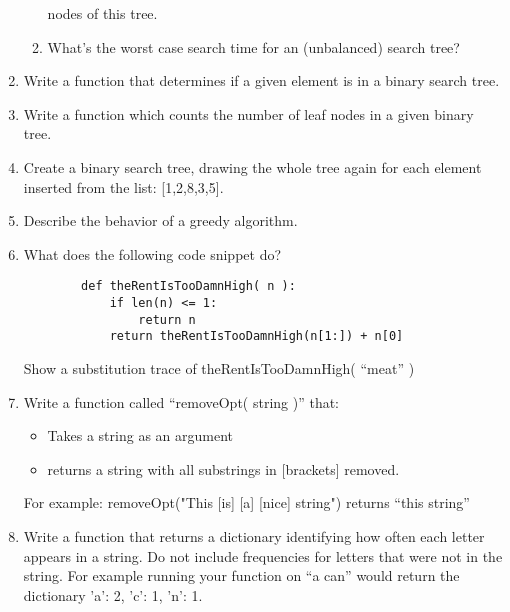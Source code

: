 \documentclass[11pt]{article}
\begin{document}
\begin{enumerate}
\begin{enumerate}
            nodes of this tree.
                \vspace{.25in}
            \item What's the worst case search time for an (unbalanced) search
            tree?
                \pagebreak
        \end{enumerate}
    \item Write a function that determines if a given element is in a binary search tree.
        \vspace{3in}
    \item Write a function which counts the number of leaf nodes in a given binary tree.
        \pagebreak
    \item Create a binary search tree, drawing the whole tree
        again for each element inserted from the list: [1,2,8,3,5].
        \vspace{6in}
    \item Describe the behavior of a greedy algorithm.
        \pagebreak

    \item What does the following code snippet do?
        \begin{verbatim}
        def theRentIsTooDamnHigh( n ):
            if len(n) <= 1:
                return n
            return theRentIsTooDamnHigh(n[1:]) + n[0]
        \end{verbatim}
            \vspace{1in}
        Show a substitution trace of theRentIsTooDamnHigh( ``meat'' )
            \vspace{2in}
    \item Write a function called ``removeOpt( string )'' that:
        \begin{itemize}
            \item Takes a string as an argument
            \item returns a string with all substrings in [brackets] removed.
        \end{itemize}
        For example:    
            removeOpt("This [is] [a] [nice] string")
            returns ``this   string'' 
        \pagebreak
    
    \item Write a function that returns a dictionary identifying how often each
    letter appears in a string. Do not include frequencies for letters that
    were not in the string. For example running your function on ``a can''
    would return the dictionary {'a': 2, 'c': 1, 'n': 1}.
        \vspace{3in}
    

\end{enumerate}
\end{document}
